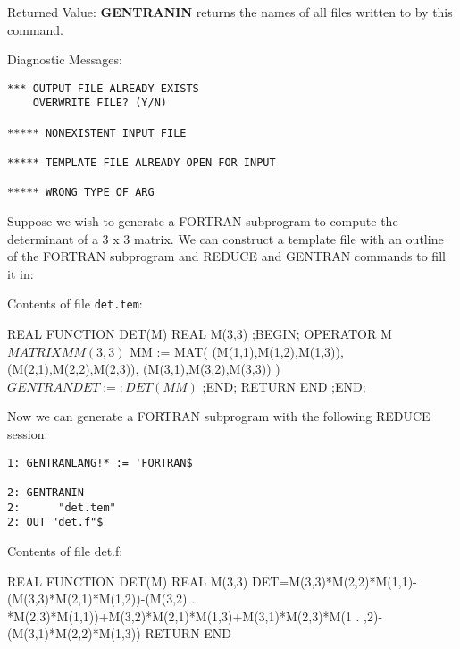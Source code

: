 \begin{describe}{Returned Value:}
{\bf GENTRANIN} returns the names of all files written to by this
command.
\end{describe}
\begin{describe}{Diagnostic Messages:}
\begin{verbatim}
*** OUTPUT FILE ALREADY EXISTS
    OVERWRITE FILE? (Y/N)

***** NONEXISTENT INPUT FILE

***** TEMPLATE FILE ALREADY OPEN FOR INPUT

***** WRONG TYPE OF ARG
\end{verbatim}
\end{describe}
\begin{describe}{\example}
Suppose we wish to generate a FORTRAN subprogram to compute the
determinant of a 3 x 3 matrix.  We can construct a template
file with an outline of the FORTRAN subprogram and REDUCE and
GENTRAN commands to fill it in:

Contents of file {\tt det.tem}:
\end{describe}
\begin{framedverbatim}
      REAL FUNCTION DET(M)                         
      REAL M(3,3)                                  
;BEGIN;                                              
      OPERATOR M$                                    
      MATRIX MM(3,3)$                                
      MM := MAT( (M(1,1),M(1,2),M(1,3)),             
                 (M(2,1),M(2,2),M(2,3)),             
                 (M(3,1),M(3,2),M(3,3)) )$           
      GENTRAN DET :=: DET(MM)$                       
;END;                                                
      RETURN                                         
      END                                            
;END;                                                
\end{framedverbatim}

\begin{describe}{}
Now we can generate a FORTRAN subprogram with the following
REDUCE session:
\begin{verbatim}
1: GENTRANLANG!* := 'FORTRAN$ 

2: GENTRANIN 
2:      "det.tem" 
2: OUT "det.f"$ 
\end{verbatim}
Contents of file det.f:
\end{describe}
\begin{framedverbatim}
      REAL FUNCTION DET(M)
      REAL M(3,3)
      DET=M(3,3)*M(2,2)*M(1,1)-(M(3,3)*M(2,1)*M(1,2))-(M(3,2)
     . *M(2,3)*M(1,1))+M(3,2)*M(2,1)*M(1,3)+M(3,1)*M(2,3)*M(1
     . ,2)-(M(3,1)*M(2,2)*M(1,3))
      RETURN
      END
\end{framedverbatim}

